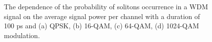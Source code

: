 \begin{figure}[htpb]
\begin{minipage}[h]{0.47\linewidth}
{        }
    \end{minipage}
    \vfill
    \begin{minipage}[h]{0.47\linewidth}
    \end{minipage}
    \hfill
    \begin{minipage}[h]{0.47\linewidth}
    \end{minipage}

    \caption{The dependence of the probability of solitons occurrence in a WDM signal on the average signal power per channel with a duration of 100 ps and (a) QPSK, (b) 16-QAM, (c) 64-QAM, (d) 1024-QAM modulation.}
    \label{fig:wdm_result_mod_all}
\end{figure}

